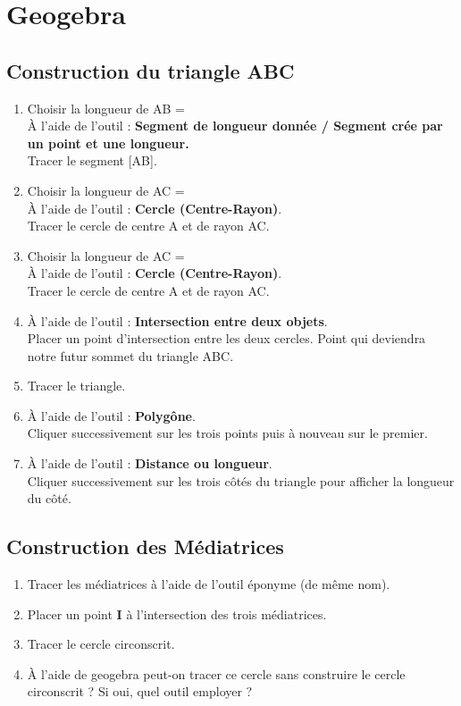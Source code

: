 \documentclass[11pt]{article}
\begin{document}
\section{Geogebra}

\subsection{Construction du triangle ABC}
\begin{enumerate}
\item Choisir la longueur de AB = \\
À l'aide de l'outil : \textbf{Segment de longueur donnée / Segment crée par un point et une longueur.}\\
Tracer le segment [AB].
\item Choisir la longueur de AC = \\
À l'aide de l'outil : \textbf{Cercle (Centre-Rayon)}.\\
Tracer le cercle de centre A et de rayon AC.
\item Choisir la longueur de AC = \\
À l'aide de l'outil : \textbf{Cercle (Centre-Rayon)}.\\
Tracer le cercle de centre A et de rayon AC.
\item À l'aide de l'outil : \textbf{Intersection entre deux objets}.\\
Placer un point d'intersection entre les deux cercles. Point qui deviendra notre futur sommet du triangle ABC.
\item Tracer le triangle.
\item À l'aide de l'outil : \textbf{Polygône}.\\
Cliquer successivement sur les trois points puis à nouveau sur le premier.
\item À l'aide de l'outil : \textbf{Distance ou longueur}.\\
Cliquer successivement sur les trois côtés du triangle pour afficher la longueur du côté.
\end{enumerate}

\subsection{Construction des Médiatrices}
\begin{enumerate}
\item Tracer les médiatrices à l'aide de l'outil éponyme (de même nom).
\item Placer un point \textbf{I} à l'intersection des trois médiatrices.
\item Tracer le cercle circonscrit.
\item À l'aide de geogebra peut-on tracer ce cercle sans construire le cercle circonscrit ? Si oui, quel outil employer ?
\end{enumerate}
\end{document}

